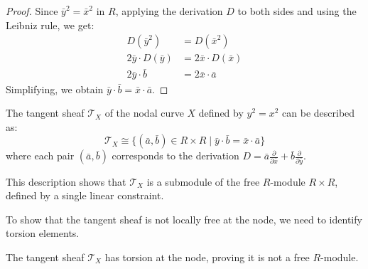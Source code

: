 \documentclass[12pt]{article}
\begin{document}
\begin{proof}
Since $\bar{y}^2 = \bar{x}^2$ in $R$, applying the derivation $D$ to both sides and using the Leibniz rule, we get:
\begin{align}
D(\bar{y}^2) &= D(\bar{x}^2)\\
2\bar{y} \cdot D(\bar{y}) &= 2\bar{x} \cdot D(\bar{x})\\
2\bar{y} \cdot \bar{b} &= 2\bar{x} \cdot \bar{a}
\end{align}
Simplifying, we obtain $\bar{y} \cdot \bar{b} = \bar{x} \cdot \bar{a}$.
\end{proof}

\begin{theorem}
The tangent sheaf $\mathcal{T}_X$ of the nodal curve $X$ defined by $y^2 = x^2$ can be described as:
\begin{equation}
\mathcal{T}_X \cong \{(\bar{a},\bar{b}) \in R \times R \mid \bar{y} \cdot \bar{b} = \bar{x} \cdot \bar{a}\}
\end{equation}
where each pair $(\bar{a},\bar{b})$ corresponds to the derivation $D = \bar{a}\frac{\partial}{\partial \bar{x}} + \bar{b}\frac{\partial}{\partial \bar{y}}$.
\end{theorem}

\begin{remark}
This description shows that $\mathcal{T}_X$ is a submodule of the free $R$-module $R \times R$, defined by a single linear constraint.
\end{remark}
To show that the tangent sheaf is not locally free at the node, we need to identify torsion elements.

\begin{proposition}
The tangent sheaf $\mathcal{T}_X$ has torsion at the node, proving it is not a free $R$-module.
\end{proposition}
\end{document}
